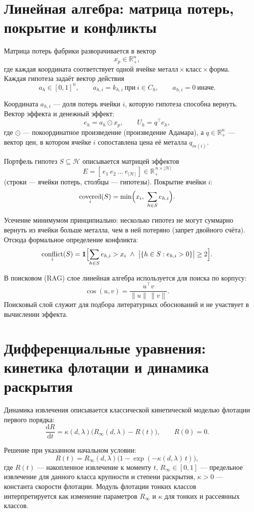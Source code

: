 \documentclass[12pt,a4paper]{article}
\newcommand{\R}{\mathbb{R}}
\newcommand{\Hyp}{\mathcal{H}}
\DeclareMathOperator{\covered}{covered}
\DeclareMathOperator{\conflict}{conflict}
\begin{document}
\section{Линейная алгебра: матрица потерь, покрытие и конфликты}

Матрица потерь фабрики разворачивается в вектор
\[
  x_p \in \R_+^n,
\]
где каждая координата соответствует одной ячейке
\(\text{металл} \times \text{класс} \times \text{форма}\).
Каждая гипотеза задаёт вектор действия
\[
  a_h \in [0,1]^n,
  \qquad
  a_{h,i} = k_{h,i}\ \text{при}\ i \in C_h,
  \qquad
  a_{h,i} = 0\ \text{иначе}.
\]

Координата \(a_{h,i}\) --- доля потерь ячейки \(i\), которую гипотеза способна
вернуть. Вектор эффекта и денежный эффект:
\[
  e_h = a_h \odot x_p,
  \qquad
  U_h = q^\top e_h,
\]
где \(\odot\) --- покоординатное произведение (произведение Адамара), а
\(q \in \R_+^n\) --- вектор цен, в котором ячейке \(i\) сопоставлена цена её
металла \(q_{m(i)}\).

Портфель гипотез \(S \subseteq \Hyp\) описывается матрицей эффектов
\[
  E = [\,e_1\ e_2\ \dots\ e_{|\Hyp|}\,] \in \R_+^{\,n \times |\Hyp|}
\]
(строки --- ячейки потерь, столбцы --- гипотезы). Покрытие ячейки \(i\):
\[
  \covered_i(S) =
  \min\Bigl(x_i,\ \sum_{h \in S} e_{h,i}\Bigr).
\]

Усечение минимумом принципиально: несколько гипотез не могут суммарно вернуть
из ячейки больше металла, чем в ней потеряно (запрет двойного счёта). Отсюда
формальное определение конфликта:
\[
  \conflict_i(S) =
  \mathbf{1}\Bigl[
    \sum_{h \in S} e_{h,i} > x_i
    \ \wedge\
    \bigl|\{h \in S : e_{h,i}>0\}\bigr| \ge 2
  \Bigr].
\]

В поисковом (RAG) слое линейная алгебра используется для поиска по корпусу:
\[
  \cos(u,v) =
  \frac{u^\top v}{\|u\|\,\|v\|}.
\]
Поисковый слой служит для подбора литературных обоснований и не участвует в
вычислении эффекта.

\section{Дифференциальные уравнения: кинетика флотации и динамика раскрытия}

Динамика извлечения описывается классической кинетической моделью флотации
первого порядка:
\[
  \frac{\mathrm{d}R}{\mathrm{d}t} =
  \kappa(d,\lambda)\bigl(R_\infty(d,\lambda)-R(t)\bigr),
  \qquad R(0) = 0.
\]

Решение при указанном начальном условии:
\[
  R(t) =
  R_\infty(d,\lambda)
  \bigl(1-\exp(-\kappa(d,\lambda)\,t)\bigr),
\]
где \(R(t)\) --- накопленное извлечение к моменту \(t\),
\(R_\infty \in [0,1]\) --- предельное извлечение для данного класса крупности
и степени раскрытия, \(\kappa > 0\) --- константа скорости флотации.
Модуль флотации тонких классов интерпретируется как изменение параметров
\(R_\infty\) и \(\kappa\) для тонких и рассеянных классов.
\end{document}
